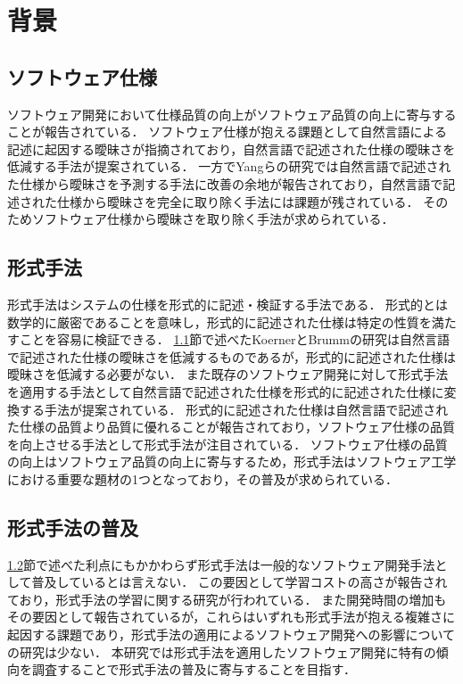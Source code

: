 \documentclass[main]{subfiles}
\begin{document}
\chapter{背景}

\section{ソフトウェア仕様}
\label{sec:specification}

ソフトウェア開発において仕様品質の向上がソフトウェア品質の向上に寄与することが報告されている\cite{knauss:2009}．
ソフトウェア仕様が抱える課題として自然言語による記述に起因する曖昧さが指摘されており\cite{kamsties:2005}，自然言語で記述された仕様の曖昧さを低減する手法が提案されている\cite{korner:2009,yang:2011}．
一方でYangらの研究では自然言語で記述された仕様から曖昧さを予測する手法に改善の余地が報告されており，自然言語で記述された仕様から曖昧さを完全に取り除く手法には課題が残されている．
そのためソフトウェア仕様から曖昧さを取り除く手法が求められている．

\section{形式手法}
\label{sec:formal-method}

形式手法はシステムの仕様を形式的に記述・検証する手法である．
形式的とは数学的に厳密であることを意味し，形式的に記述された仕様は特定の性質を満たすことを容易に検証できる．
\ref{sec:specification}節で述べたKoernerとBrummの研究\cite{korner:2009}は自然言語で記述された仕様の曖昧さを低減するものであるが，形式的に記述された仕様は曖昧さを低減する必要がない．
また既存のソフトウェア開発に対して形式手法を適用する手法として自然言語で記述された仕様を形式的に記述された仕様に変換する手法が提案されている\cite{ilieva:2005}．
形式的に記述された仕様は自然言語で記述された仕様の品質より品質に優れることが報告されており\cite{fabbrini:2001}，ソフトウェア仕様の品質を向上させる手法として形式手法が注目されている．%
ソフトウェア仕様の品質の向上はソフトウェア品質の向上に寄与するため，形式手法はソフトウェア工学における重要な題材の1つとなっており，その普及が求められている．

\section{形式手法の普及}

\ref{sec:formal-method}節で述べた利点にもかかわらず形式手法は一般的なソフトウェア開発手法として普及しているとは言えない．
この要因として学習コストの高さが報告されており\cite{kurita:2011}，形式手法の学習に関する研究が行われている\cite{ohnishi:2020,araki:2010,araki:2011}．
また開発時間の増加もその要因として報告されている\cite{kitamura:2021}が，これらはいずれも形式手法が抱える複雑さに起因する課題であり，形式手法の適用によるソフトウェア開発への影響についての研究は少ない．
本研究では形式手法を適用したソフトウェア開発に特有の傾向を調査することで形式手法の普及に寄与することを目指す．
\end{document}
